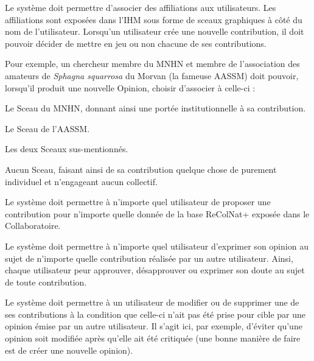 \startsubsubsection[title={Notion d'affiliation}]

\exig{}
Le système doit permettre d'associer des affiliations aux utilisateurs.
Les affiliations sont exposées dans l'IHM sous forme de sceaux graphiques à côté du nom de l'utilisateur.
Lorsqu'un utilisateur crée une nouvelle contribution, il doit pouvoir décider de mettre en jeu ou non chacune de ses contributions.

Pour exemple, un chercheur membre du MNHN et membre de l'association des amateurs de {\it Sphagna squarrosa} du Morvan (la fameuse AASSM) doit pouvoir, lorsqu'il produit une nouvelle Opinion, choisir d'associer à celle-ci :

\startitemize
	\item Le Sceau du MNHN, donnant ainsi une portée institutionnelle à sa contribution.
	\item Le Sceau de l'AASSM.
	\item Les deux Sceaux sus-mentionnés.
	\item Aucun Sceau, faisant ainsi de sa contribution quelque chose de purement individuel et n'engageant aucun collectif.
\stopitemize

\startsubsection[title={Représentation des contributions},reference:s:contributions]

\startsubsubsection[title={Opinions multiples}]

\exig{}
Le système doit permettre à n'importe quel utilisateur de proposer une contribution pour n'importe quelle donnée de la base ReColNat+ exposée dans le Collaboratoire.

\exig{}
Le système doit permettre à n'importe quel utilisateur d'exprimer son opinion au sujet de n'importe quelle contribution réalisée par un autre utilisateur.
Ainsi, chaque utilisateur peur approuver, désapprouver ou exprimer son doute au sujet de toute contribution.

\exig{}
Le système doit permettre à un utilisateur de modifier ou de supprimer une de ses contributions à la condition que celle-ci n'ait pas été prise pour cible par une opinion émise par un autre utilisateur.
Il s'agit ici, par exemple, d'éviter qu'une opinion soit modifiée après qu'elle ait été critiquée (une bonne manière de faire est de créer une nouvelle opinion).

